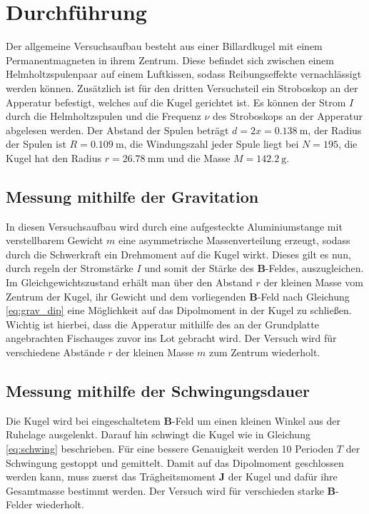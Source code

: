 \section{Durchführung}
\label{sec:Durchführung}
Der allgemeine Versuchsaufbau besteht aus einer Billardkugel mit einem Permanentmagneten in ihrem Zentrum.
Diese befindet sich zwischen einem Helmholtzspulenpaar auf einem Luftkissen, sodass Reibungseffekte vernachlässigt werden können.
Zusätzlich ist für den dritten Versuchsteil ein Stroboskop an der Apperatur befestigt, welches auf die Kugel gerichtet ist.
Es können der Strom $I$ durch die Helmholtzspulen und die Frequenz $\nu$ des Stroboskops an der Apperatur abgelesen werden.
Der Abstand der Spulen beträgt \mbox{$d=2x=\SI{0.138}{\meter}$}, der Radius der Spulen ist $R=\SI{0.109}{\meter}$,
die Windungszahl jeder Spule liegt bei $N=\num{195}$, die Kugel hat den Radius $r=\SI{26.78}{\milli\meter}$ und die Masse $M=\SI{142.2}{\gram}$.
%
\subsection{Messung mithilfe der Gravitation}
In diesen Versuchsaufbau wird durch eine aufgesteckte Aluminiumstange mit verstellbarem Gewicht $m$ eine asymmetrische Massenverteilung erzeugt,
sodass durch die Schwerkraft ein Drehmoment auf die Kugel wirkt.
Dieses gilt es nun, durch regeln der Stromstärke $I$ und somit der Stärke des $\symbf{B}$-Feldes, auszugleichen.
Im Gleichgewichtszustand
erhält man über den Abstand $r$ der kleinen Masse vom Zentrum der Kugel, ihr Gewicht und dem vorliegenden $\symbf{B}$-Feld
nach Gleichung \eqref{eq:grav_dip} eine Möglichkeit auf das Dipolmoment in der Kugel zu schließen.
Wichtig ist hierbei, dass die Apperatur mithilfe des an der Grundplatte angebrachten Fischauges zuvor ins Lot gebracht wird.
Der Versuch wird für verschiedene Abstände $r$ der kleinen Masse $m$ zum Zentrum wiederholt.
%
\subsection{Messung mithilfe der Schwingungsdauer}
Die Kugel wird bei eingeschaltetem $\symbf{B}$-Feld um einen kleinen Winkel aus der Ruhelage ausgelenkt.
Darauf hin schwingt die Kugel wie in Gleichung \eqref{eq:schwing} beschrieben.
Für eine bessere Genauigkeit werden 10 Perioden $T$ der Schwingung gestoppt und gemittelt.
Damit auf das Dipolmoment geschlossen werden kann, muss zuerst das Trägheitsmoment $\symbf{J}$ der Kugel und dafür ihre Gesamtmasse bestimmt werden.
Der Versuch wird für verschieden starke $\symbf{B}$-Felder wiederholt.
%
